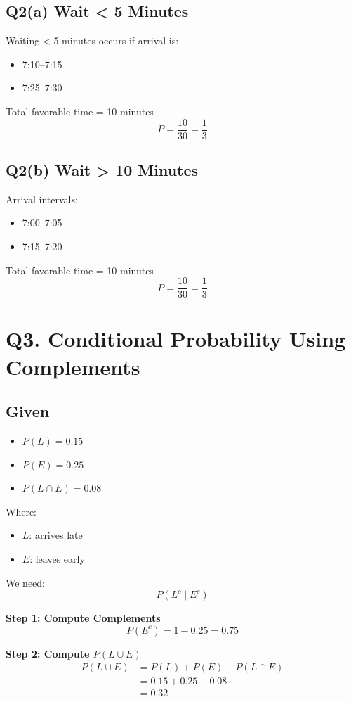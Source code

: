 \documentclass[11pt]{article}
\begin{document}
\subsection{Q2(a) Wait < 5 Minutes}
Waiting < 5 minutes occurs if arrival is:
\begin{itemize}
    \item 7:10–7:15
    \item 7:25–7:30
\end{itemize}
Total favorable time = 10 minutes
\[ P = \frac{10}{30} = \frac{1}{3} \]

\subsection{Q2(b) Wait > 10 Minutes}
Arrival intervals:
\begin{itemize}
    \item 7:00–7:05
    \item 7:15–7:20
\end{itemize}
Total favorable time = 10 minutes
\[ P = \frac{10}{30} = \frac{1}{3} \]

\section{Q3. Conditional Probability Using Complements}

\subsection{Given}
\begin{itemize}
    \item $P(L) = 0.15$
    \item $P(E) = 0.25$
    \item $P(L \cap E) = 0.08$
\end{itemize}
Where:
\begin{itemize}
    \item $L$: arrives late
    \item $E$: leaves early
\end{itemize}
We need:
\[ P(L^c \mid E^c) \]

\textbf{Step 1: Compute Complements}
\[ P(E^c) = 1 - 0.25 = 0.75 \]

\textbf{Step 2: Compute $P(L \cup E)$}
\begin{align*}
    P(L \cup E) &= P(L) + P(E) - P(L \cap E) \\
    &= 0.15 + 0.25 - 0.08 \\
    &= 0.32
\end{align*}
\end{document}

